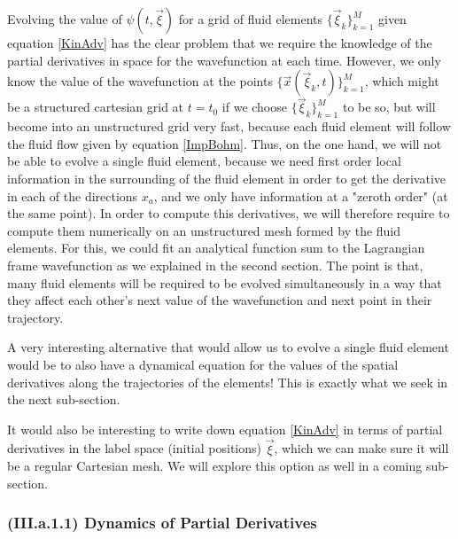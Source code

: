 \documentclass[11pt, a4paper]{article} %
\begin{document}
Evolving the value of $\psi(t,\vec{\xi})$ for a grid of fluid elements $\{\vec{\xi}_k\}_{k=1}^M$ given equation \eqref{KinAdv} has the clear problem that we require the knowledge of the partial derivatives in space for the wavefunction at each time. However, we only know the value of the wavefunction at the points $\{\vec{x}(\vec{\xi}_k,t)\}_{k=1}^M$, which might be a structured cartesian grid at $t=t_0$ if we choose $\{\vec{\xi}_k\}_{k=1}^M$ to be so, but will become into an unstructured grid very fast, because each fluid element will follow the fluid flow given by equation \eqref{ImpBohm}. Thus, on the one hand, we will not be able to evolve a single fluid element, because we need first order local information in the surrounding of the fluid element in order to get the derivative in each of the directions $x_a$, and we only have information at a "zeroth order" (at the same point). In order to compute this derivatives, we will therefore require to compute them numerically on an unstructured mesh formed by the fluid elements. For this, we could fit an analytical function sum to the Lagrangian frame wavefunction as we explained in the second section. The point is that, many fluid elements will be required to be evolved simultaneously in a way that they affect each other's next value of the wavefunction and next point in their trajectory.

A very interesting alternative that would allow us to evolve a single fluid element would be to also have a dynamical equation for the values of the spatial derivatives along the trajectories of the elements! This is exactly what we seek in the next sub-section.

It would also be interesting to write down equation \eqref{KinAdv} in terms of partial derivatives in the label space (initial positions) $\vec{\xi}$, which we can make sure it will be a regular Cartesian mesh. We will explore this option as well in a coming sub-section. 

\subsubsection*{(III.a.1.1) Dynamics of Partial Derivatives}
\end{document}
